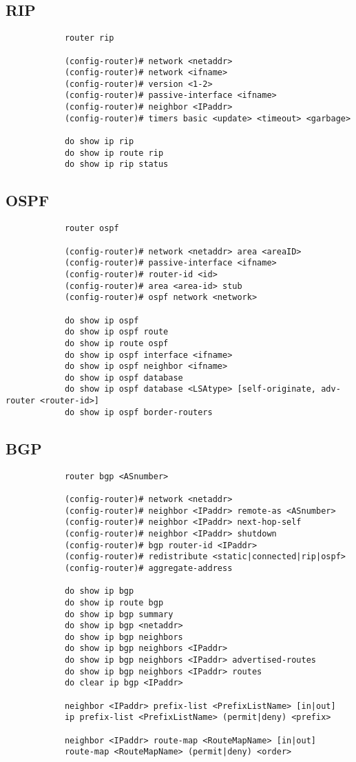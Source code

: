 \documentclass[a4paper, 12pt]{article}
\begin{document}
	\subsection{RIP}
		\begin{verbatim}
			router rip
			
			(config-router)# network <netaddr>
			(config-router)# network <ifname>
			(config-router)# version <1-2>
			(config-router)# passive-interface <ifname>
			(config-router)# neighbor <IPaddr>
			(config-router)# timers basic <update> <timeout> <garbage>
			
			do show ip rip
			do show ip route rip
			do show ip rip status
		\end{verbatim}

	\subsection{OSPF}
		\begin{verbatim}
			router ospf
			
			(config-router)# network <netaddr> area <areaID>
			(config-router)# passive-interface <ifname>
			(config-router)# router-id <id>
			(config-router)# area <area-id> stub
			(config-router)# ospf network <network>
			
			do show ip ospf
			do show ip ospf route
			do show ip route ospf
			do show ip ospf interface <ifname>
			do show ip ospf neighbor <ifname>
			do show ip ospf database
			do show ip ospf database <LSAtype> [self-originate, adv-router <router-id>]
			do show ip ospf border-routers
		\end{verbatim}

	\subsection{BGP}
		\begin{verbatim}
			router bgp <ASnumber>
			
			(config-router)# network <netaddr>
			(config-router)# neighbor <IPaddr> remote-as <ASnumber>
			(config-router)# neighbor <IPaddr> next-hop-self
			(config-router)# neighbor <IPaddr> shutdown
			(config-router)# bgp router-id <IPaddr>
			(config-router)# redistribute <static|connected|rip|ospf>
			(config-router)# aggregate-address
			
			do show ip bgp
			do show ip route bgp
			do show ip bgp summary
			do show ip bgp <netaddr>
			do show ip bgp neighbors
			do show ip bgp neighbors <IPaddr>
			do show ip bgp neighbors <IPaddr> advertised-routes
			do show ip bgp neighbors <IPaddr> routes
			do clear ip bgp <IPaddr>
			
			neighbor <IPaddr> prefix-list <PrefixListName> [in|out]
			ip prefix-list <PrefixListName> (permit|deny) <prefix>
			
			neighbor <IPaddr> route-map <RouteMapName> [in|out]
			route-map <RouteMapName> (permit|deny) <order>
		\end{verbatim}
\end{document}
